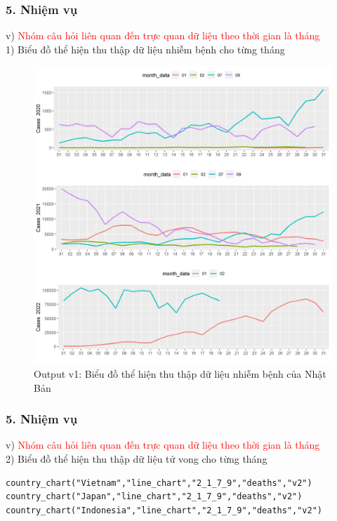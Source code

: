 \documentclass[english,10pt,table]{beamer}
\begin{document}
\begin{frame}[fragile]
\frametitle{5.  Nhiệm vụ}
v) \textcolor{red}{Nhóm câu hỏi liên quan đến trực quan dữ liệu theo thời gian là tháng}\\
    1) Biểu đồ thể hiện thu thập dữ liệu nhiễm bệnh cho từng tháng
	\begin{figure}[h!]
	\begin{center}
		    \includegraphics[scale = 0.28]{Images/V/v1 Japan .jpeg}
		     \caption{Output v1: Biểu đồ thể hiện thu thập dữ liệu nhiễm bệnh của Nhật Bản}
		\end{center}
		\end{figure}
\end{frame}

\begin{frame}[fragile]
\frametitle{5.  Nhiệm vụ}
v) \textcolor{red}{Nhóm câu hỏi liên quan đến trực quan dữ liệu theo thời gian là tháng}\\
    2) Biểu đồ thể hiện thu thập dữ liệu tử vong cho từng tháng
    	\begin{lstlisting}[frame=single,basicstyle=\tiny] 
country_chart("Vietnam","line_chart","2_1_7_9","deaths","v2")
country_chart("Japan","line_chart","2_1_7_9","deaths","v2")
country_chart("Indonesia","line_chart","2_1_7_9","deaths","v2")
		\end{lstlisting}	
\end{frame}
\end{document}
